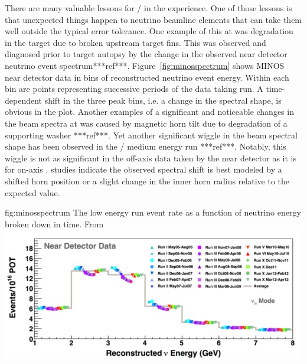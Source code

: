 There are many valuable lessons for / in the  experience. One of those lessons is that unexpected things happen to neutrino beamline elements that can take them well outside the typical error tolerance.  One example of this at  was degradation in the target due to broken upstream target fins.  This was observed and diagnosed prior to target autopsy by the change in the observed near detector neutrino event spectrum***ref***.  Figure~\ref{fig:minosspectrum} shows MINOS near detector data in bins of reconstructed neutrino event energy.  Within each bin are points representing successive periods of the data taking run.  A time-dependent shift in the three peak bins, i.e. a change in the spectral shape, is obvious in the plot. Another examples of a significant and noticeable changes in the beam spectra at  was caused by magnetic horn tilt due to degradation of a supporting washer ***ref***.  Yet another significant wiggle in the beam spectral shape has been observed in the / medium energy run ***ref***.  Notably, this wiggle is not as significant in the off-axis data taken by the  near detector as it is for on-axis .   studies indicate the observed spectral shift is best modeled by a shifted horn position or a slight change in the inner horn radius relative to the expected value.

\begin{dunefigure}{fig:minosspectrum}
{The low energy run  event rate as a function of neutrino energy broken down in time. From~\cite{**}}
  \includegraphics[width=5.in]{graphics/MINOS_LE_run.jpg}
\end{dunefigure}

